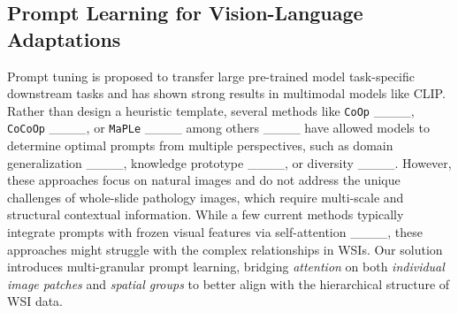 \subsection{Prompt Learning for Vision-Language Adaptations}
Prompt tuning is proposed to transfer large pre-trained model task-specific downstream tasks and has shown strong results in multimodal models like CLIP. Rather than design a heuristic template, several methods like \texttt{CoOp} ____, \texttt{CoCoOp} ____, or \texttt{MaPLe} ____ among others ____ have allowed models to determine optimal prompts from multiple perspectives, such as domain generalization ____, knowledge prototype ____, or diversity ____. However, these approaches focus on natural images and do not address the unique challenges of whole-slide pathology images, which require multi-scale and structural contextual information. While a few current methods typically integrate prompts with frozen visual features via self-attention ____, these approaches might struggle with the complex relationships in WSIs. Our solution introduces multi-granular prompt learning, bridging \textit{attention} on both \textit{individual image patches} and \textit{spatial groups} to better align with the hierarchical structure of WSI data.
